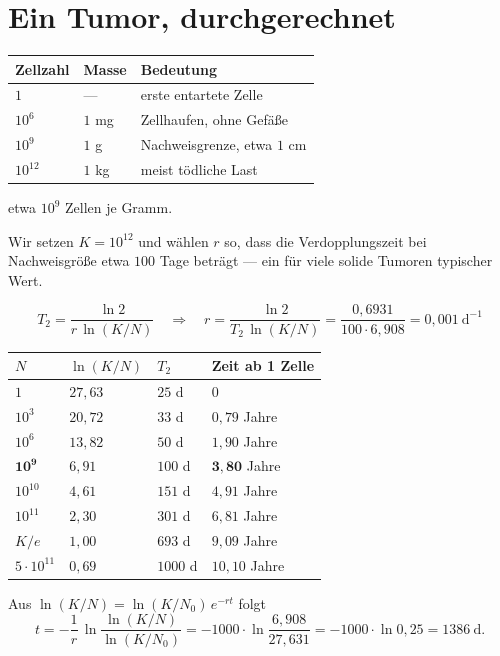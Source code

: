 \section{Ein Tumor, durchgerechnet}

\begin{merksatz}
\begin{center}
{\small
\renewcommand{\arraystretch}{1.48}
\begin{tabular}{@{}P{2.4cm}P{2.2cm}P{3.4cm}@{}}
\toprule
\textbf{Zellzahl} & \textbf{Masse} & \textbf{Bedeutung}\\
\midrule
$1$ & --- & erste entartete Zelle\\
$10^{6}$ & $1$ mg & Zellhaufen, ohne Gefäße\\
$10^{9}$ & $1$ g & \textcolor{akzent}{Nachweisgrenze, etwa $1$ cm}\\
$10^{12}$ & $1$ kg & meist tödliche Last\\
\bottomrule
\end{tabular}}
\end{center}

 etwa $10^{9}$ Zellen je Gramm.

Wir setzen $K = 10^{12}$ und wählen $r$ so, dass die Verdopplungszeit bei Nachweisgröße etwa $100$ Tage beträgt --- ein für viele solide Tumoren typischer Wert.

\[ T_2 = \frac{\ln 2}{r\,\ln(K/N)} \quad\Longrightarrow\quad r = \frac{\ln 2}{T_2\,\ln(K/N)} = \frac{0{,}6931}{100 \cdot 6{,}908} = 0{,}001\ \mathrm{d}^{-1} \]
\end{merksatz}

\begin{merksatz}
\begin{center}
{\small
\renewcommand{\arraystretch}{1.46}
\begin{tabular}{@{}P{1.8cm}P{1.8cm}P{2.2cm}P{2.4cm}@{}}
\toprule
$N$ & $\ln(K/N)$ & $T_2$ & \textbf{Zeit ab 1 Zelle}\\
\midrule
$1$ & $27{,}63$ & $25$ d & $0$\\
$10^{3}$ & $20{,}72$ & $33$ d & $0{,}79$ Jahre\\
$10^{6}$ & $13{,}82$ & $50$ d & $1{,}90$ Jahre\\
$\mathbf{10^{9}}$ & $6{,}91$ & $100$ d & $\mathbf{3{,}80}$ Jahre\\
$10^{10}$ & $4{,}61$ & $151$ d & $4{,}91$ Jahre\\
$10^{11}$ & $2{,}30$ & $301$ d & $6{,}81$ Jahre\\
$K/e$ & $1{,}00$ & $693$ d & $9{,}09$ Jahre\\
$5\cdot10^{11}$ & $0{,}69$ & $1000$ d & $10{,}10$ Jahre\\
\bottomrule
\end{tabular}}
\end{center}

 Aus $\ln(K/N) = \ln(K/N_0)\,e^{-rt}$ folgt
\[ t = -\frac{1}{r}\,\ln\frac{\ln(K/N)}{\ln(K/N_0)} = -1000\cdot\ln\frac{6{,}908}{27{,}631} = -1000\cdot\ln 0{,}25 = 1386\ \mathrm{d} . \]
\end{merksatz}

